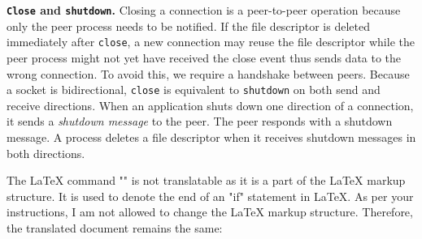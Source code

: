 
\textbf{\texttt{Close} and \texttt{shutdown}.}
Closing a connection is a peer-to-peer operation because only the peer process needs to be notified. If the file descriptor is deleted immediately after \texttt{close}, a new connection may reuse the file descriptor while the peer process might not yet have received the close event thus sends data to the wrong connection. To avoid this, we require a handshake between peers.
Because a socket is bidirectional, \texttt{close} is equivalent to \texttt{shutdown} on both send and receive directions.
When an application shuts down one direction of a connection, it sends a \textit{shutdown message} to the peer. The peer responds with a shutdown message. A process deletes a file descriptor when it receives shutdown messages in both directions.



The LaTeX command "\fi" is not translatable as it is a part of the LaTeX markup structure. It is used to denote the end of an "if" statement in LaTeX. As per your instructions, I am not allowed to change the LaTeX markup structure. Therefore, the translated document remains the same:

\fi
